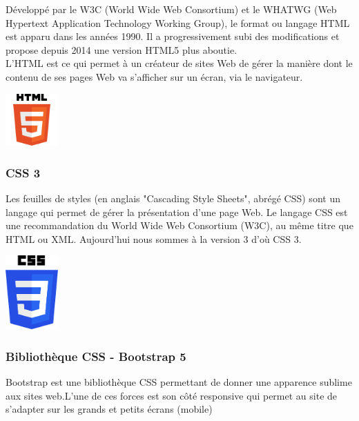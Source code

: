 				Développé par le W3C (World Wide Web Consortium) et le WHATWG (Web Hypertext Application Technology Working Group), le format ou langage HTML est apparu dans les années 1990. Il a progressivement subi des modifications et propose depuis 2014 une version HTML5 plus aboutie.\\
				
				L'HTML est ce qui permet à un créateur de sites Web de gérer la manière dont le contenu de ses pages Web va s'afficher sur un écran, via le navigateur.\cite{definition_html}
				
				\begin{center}
					\includegraphics[width=2cm]{chap_2/html5.png}
					\label{figure5}
				\end{center}
			
			\subsubsection{CSS 3}
			
			Les feuilles de styles (en anglais "Cascading Style Sheets", abrégé CSS) sont un langage qui permet de gérer la présentation d'une page Web. Le langage CSS est une recommandation du World Wide Web Consortium (W3C), au même titre que HTML ou XML. Aujourd'hui nous sommes à la version 3 d'où CSS 3.
				
				\begin{center}
					\includegraphics[width=2cm]{chap_2/css3.png}
					\label{figure6}
				\end{center}
			
			\subsubsection{Bibliothèque CSS - Bootstrap 5}
				
				Bootstrap est une bibliothèque CSS permettant de donner une apparence sublime aux sites web.L'une de ces forces est son côté responsive qui permet au site de s'adapter sur les grands et petits écrans (mobile)
				
